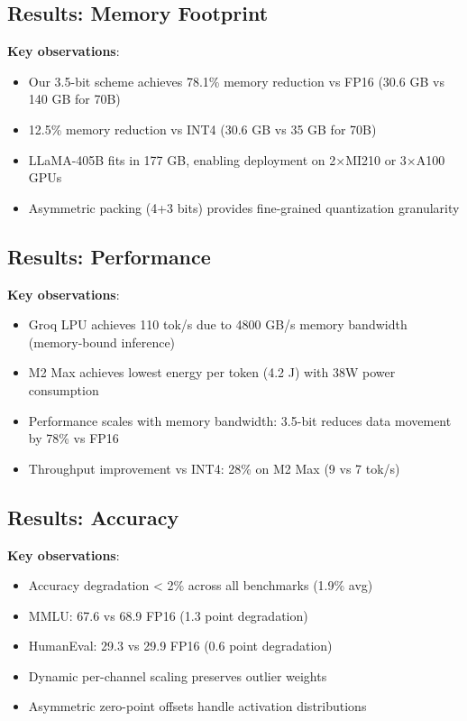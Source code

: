 \documentclass{article}
\begin{document}
\subsection{Results: Memory Footprint}



\textbf{Key observations}:
\begin{itemize}
    \item Our 3.5-bit scheme achieves 78.1\% memory reduction vs FP16 (30.6 GB vs 140 GB for 70B)
    \item 12.5\% memory reduction vs INT4 (30.6 GB vs 35 GB for 70B)
    \item LLaMA-405B fits in 177 GB, enabling deployment on 2×MI210 or 3×A100 GPUs
    \item Asymmetric packing (4+3 bits) provides fine-grained quantization granularity
\end{itemize}

\subsection{Results: Performance}



\textbf{Key observations}:
\begin{itemize}
    \item Groq LPU achieves 110 tok/s due to 4800 GB/s memory bandwidth (memory-bound inference)
    \item M2 Max achieves lowest energy per token (4.2 J) with 38W power consumption
    \item Performance scales with memory bandwidth: 3.5-bit reduces data movement by 78\% vs FP16
    \item Throughput improvement vs INT4: 28\% on M2 Max (9 vs 7 tok/s)
\end{itemize}

\subsection{Results: Accuracy}



\textbf{Key observations}:
\begin{itemize}
    \item Accuracy degradation < 2\% across all benchmarks (1.9\% avg)
    \item MMLU: 67.6 vs 68.9 FP16 (1.3 point degradation)
    \item HumanEval: 29.3 vs 29.9 FP16 (0.6 point degradation)
    \item Dynamic per-channel scaling preserves outlier weights
    \item Asymmetric zero-point offsets handle activation distributions
\end{itemize}
\end{document}
